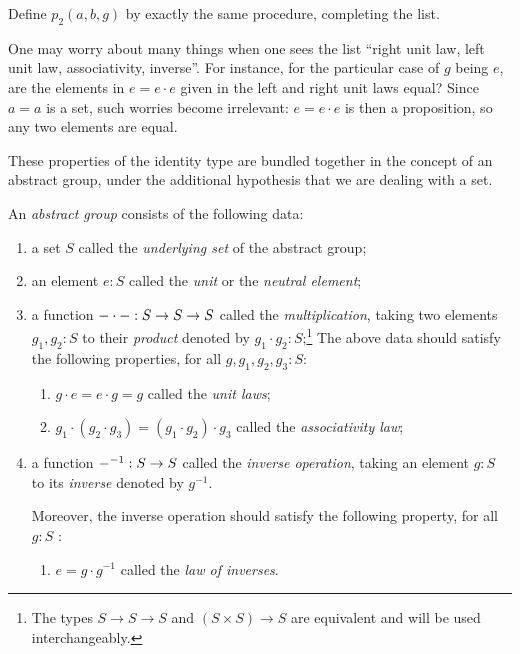 \begin{xca}\label{xca:p2}
    Define $p_2(a,b,g)$ %
by exactly the same procedure, completing the list.
\end{xca}

\begin{remark}
   One may worry about many things when one sees the list ``right unit law, left unit law, associativity, inverse''.  For instance, for the particular case of $g$ being $e$, are the elements in $e=e\cdot e$ given in the left and right unit laws equal?  Since $a=a$ is a set, such worries become irrelevant: $e=e\cdot e$ is then a proposition, so any two elements are equal.
 \end{remark}

These properties of the identity type are bundled together in the concept of an abstract group, under the additional hypothesis that we are dealing with a set.

\begin{definition}\label{def:abstractgroup}
  An \emph{abstract group} consists of the following data:
  \begin{enumerate}
  \item a set $S$ called the \emph{underlying set} of the abstract group;
  \item an element $e:S$ called the \emph{unit} or the \emph{neutral element};
  \item\label{struc:mult-op} a function ${{-}}\cdot{{-}}: S\to S\to S$ called the \emph{multiplication},
    taking two elements $g_1,g_2:S$ to their \emph{product} denoted by $g_1\cdot g_2:S$;\footnote{%
      The types $S\to S\to S$ and $(S\times S)\to S$ are equivalent
and will be used interchangeably.}
  The above data should satisfy the following properties, for all $g,g_1,g_2,g_3 : S$:
    \begin{enumerate}[label=(\alph*),ref=(\alph*)]
    \item\label{axiom:unit-laws} %
      $g\cdot e=e\cdot g=g$ called the \emph{unit laws};
    \item\label{axiom:ass-law} %
      $g_1\cdot(g_2\cdot g_3)=(g_1\cdot g_2)\cdot g_3$ called the \emph{associativity law};
  \end{enumerate}
  \item\label{struc:inv-op} a function ${-}^{-1}: S\to S$ called the \emph{inverse operation},
    taking an element $g:S$ to its \emph{inverse} denoted by $g^{-1}$.

    \noindent Moreover, the inverse operation should satisfy the
    following property, for all $g:S$ :
    \begin{enumerate}[resume*]
    \item\label{axiom:inv-law} %
      $ e = g\cdot g^{-1}$ called the \emph{law of inverses}.
    \end{enumerate}
  \end{enumerate}
\end{definition} 

